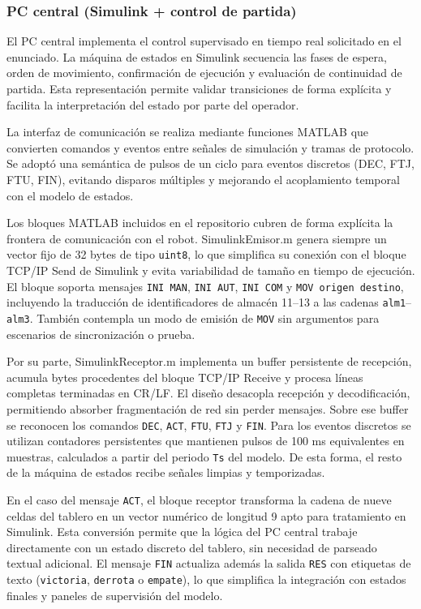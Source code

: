 \documentclass[12pt,a4paper]{article}
\begin{document}
\subsubsection{PC central (Simulink + control de partida)}
El PC central implementa el control supervisado en tiempo real solicitado en el enunciado. La máquina de estados en Simulink secuencia las fases de espera, orden de movimiento, confirmación de ejecución y evaluación de continuidad de partida. Esta representación permite validar transiciones de forma explícita y facilita la interpretación del estado por parte del operador.
\par
La interfaz de comunicación se realiza mediante funciones MATLAB que convierten comandos y eventos entre señales de simulación y tramas de protocolo. Se adoptó una semántica de pulsos de un ciclo para eventos discretos (DEC, FTJ, FTU, FIN), evitando disparos múltiples y mejorando el acoplamiento temporal con el modelo de estados.

Los bloques MATLAB incluidos en el repositorio cubren de forma explícita la frontera de comunicación con el robot. SimulinkEmisor.m genera siempre un vector fijo de 32 bytes de tipo \texttt{uint8}, lo que simplifica su conexión con el bloque TCP/IP Send de Simulink y evita variabilidad de tamaño en tiempo de ejecución. El bloque soporta mensajes \texttt{INI MAN}, \texttt{INI AUT}, \texttt{INI COM} y \texttt{MOV origen destino}, incluyendo la traducción de identificadores de almacén 11--13 a las cadenas \texttt{alm1}--\texttt{alm3}. También contempla un modo de emisión de \texttt{MOV} sin argumentos para escenarios de sincronización o prueba.

Por su parte, SimulinkReceptor.m implementa un buffer persistente de recepción, acumula bytes procedentes del bloque TCP/IP Receive y procesa líneas completas terminadas en CR/LF. El diseño desacopla recepción y decodificación, permitiendo absorber fragmentación de red sin perder mensajes. Sobre ese buffer se reconocen los comandos \texttt{DEC}, \texttt{ACT}, \texttt{FTU}, \texttt{FTJ} y \texttt{FIN}. Para los eventos discretos se utilizan contadores persistentes que mantienen pulsos de 100 ms equivalentes en muestras, calculados a partir del periodo \texttt{Ts} del modelo. De esta forma, el resto de la máquina de estados recibe señales limpias y temporizadas.

En el caso del mensaje \texttt{ACT}, el bloque receptor transforma la cadena de nueve celdas del tablero en un vector numérico de longitud 9 apto para tratamiento en Simulink. Esta conversión permite que la lógica del PC central trabaje directamente con un estado discreto del tablero, sin necesidad de parseado textual adicional. El mensaje \texttt{FIN} actualiza además la salida \texttt{RES} con etiquetas de texto (\texttt{victoria}, \texttt{derrota} o \texttt{empate}), lo que simplifica la integración con estados finales y paneles de supervisión del modelo.
\end{document}
